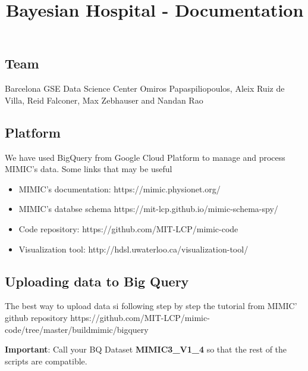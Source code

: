 \documentclass[12pt]{article}
\begin{document}
\def\moveover{\hskip 4.2 true in}





\bigskip

\bigskip


\title{Bayesian Hospital - Documentation}

\date{}

\maketitle

\subsection*{Team}

Barcelona GSE Data Science Center
Omiros Papaspiliopoulos, Aleix Ruiz de Villa, Reid Falconer, Max Zebhauser and Nandan Rao

\subsection*{Platform}

We have used BigQuery from Google Cloud Platform to manage and process MIMIC's data. Some links that may be useful

\begin{itemize}
	\item MIMIC's documentation: https://mimic.physionet.org/
	\item MIMIC's databse schema https://mit-lcp.github.io/mimic-schema-spy/
	\item Code repository: https://github.com/MIT-LCP/mimic-code
	\item Visualization tool: http://hdsl.uwaterloo.ca/visualization-tool/
\end{itemize}

\subsection*{Uploading data to Big Query}

The best way to upload data si following step by step the tutorial from MIMIC' github repository 
https://github.com/MIT-LCP/mimic-code/tree/master/buildmimic/bigquery

\textbf{Important}: Call your BQ Dataset \textbf{MIMIC3\_V1\_4} so that the rest of the scripts are compatible.
\end{document}
